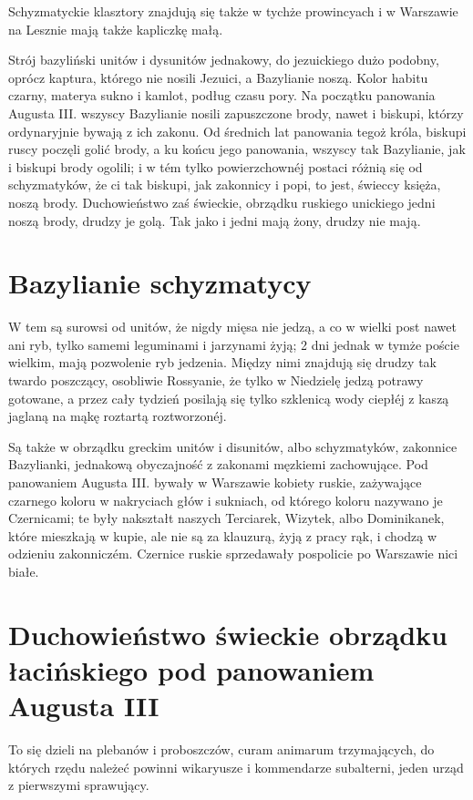 \documentclass{book}
\begin{document}
Schyzmatyckie klasztory znajdują się także w tychże prowincyach i w Warszawie na Lesznie mają także kapliczkę małą.

Strój bazyliński unitów i dysunitów jednakowy, do jezuickiego dużo podobny, oprócz kaptura, którego nie nosili Jezuici, a Bazylianie noszą. Kolor habitu czarny, materya sukno i kamlot, podług czasu pory. Na początku panowania Augusta III. wszyscy Bazylianie nosili zapuszczone brody, nawet i biskupi, którzy ordynaryjnie bywają z ich zakonu. Od średnich lat panowania tegoż króla, biskupi ruscy poczęli golić brody, a ku końcu jego panowania, wszyscy tak Bazylianie, jak i biskupi brody ogolili; i w tém tylko powierzchownéj postaci różnią się od schyzmatyków, że ci tak biskupi, jak zakonnicy i popi, to jest, świeccy księża, noszą brody. Duchowieństwo zaś świeckie, obrządku ruskiego unickiego jedni noszą brody, drudzy je golą. Tak jako i jedni mają żony, drudzy nie mają.

\section{Bazylianie schyzmatycy}

W tem są surowsi od unitów, że nigdy mięsa nie jedzą, a co w wielki post nawet ani ryb, tylko samemi leguminami i jarzynami żyją; 2 dni jednak w tymże poście wielkim, mają pozwolenie ryb jedzenia. Między nimi znajdują się drudzy tak twardo poszczący, osobliwie Rossyanie, że tylko w Niedzielę jedzą potrawy gotowane, a przez cały tydzień posilają się tylko szklenicą wody ciepłéj z kaszą jaglaną na mąkę roztartą roztworzonéj.

Są także w obrządku greckim unitów i disunitów, albo schyzmatyków, zakonnice Bazylianki, jednakową obyczajność z zakonami męzkiemi zachowujące. Pod panowaniem Augusta III. bywały w Warszawie kobiety ruskie, zażywające czarnego koloru w nakryciach głów i sukniach, od którego koloru nazywano je Czernicami; te były nakształt naszych Terciarek, Wizytek, albo Dominikanek, które mieszkają w kupie, ale nie są za klauzurą, żyją z pracy rąk, i chodzą w odzieniu zakonniczém. Czernice ruskie sprzedawały pospolicie po Warszawie nici białe.

\section[Duchowieństwo świeckie]{Duchowieństwo świeckie obrządku łacińskiego pod panowaniem Augusta III}

To się dzieli na plebanów i proboszczów, curam animarum trzymających, do których rzędu należeć powinni wikaryusze i kommendarze subalterni, jeden urząd z pierwszymi sprawujący.
\end{document}
